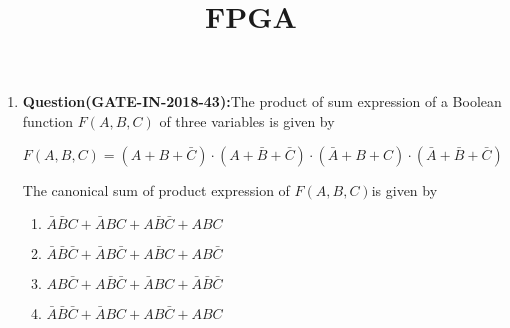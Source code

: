 \documentclass[12pt]{article}
\begin{document}
\title{\textbf{FPGA}}
\date{}
\maketitle
\begin{enumerate}
    \item \textbf{Question(GATE-IN-2018-43):}The product of sum expression of a Boolean function $F(A,B,C)$ of three variables is given
by 

$F\left ( A,B,C \right )=\left ( A+B+\bar{C} \right )\cdot \left ( A+\bar{B}+\bar{C} \right )\cdot \left ( \bar{A}+B+C \right )\cdot \left ( \bar{A}+\bar{B}+\bar{C} \right )$
  

   The canonical sum of product expression of $F(A,B,C
   )$is given by
    \begin{enumerate}
      \item $\bar{A}\bar{B}C+\bar{A}BC+A\bar{B}\bar{C}+ABC$

\item $\bar{A}\bar{B}\bar{C}+\bar{A}B\bar{C}+A\bar{B}C+AB\bar{C}$

\item $AB\bar{C}+A\bar{B}\bar{C}+\bar{A}BC+\bar{A}\bar{B}\bar{C}$

\item $\bar{A}\bar{B}\bar{C}+\bar{A}BC+AB\bar{C}+ABC$
    \end{enumerate}


\end{enumerate}
\end{document}
